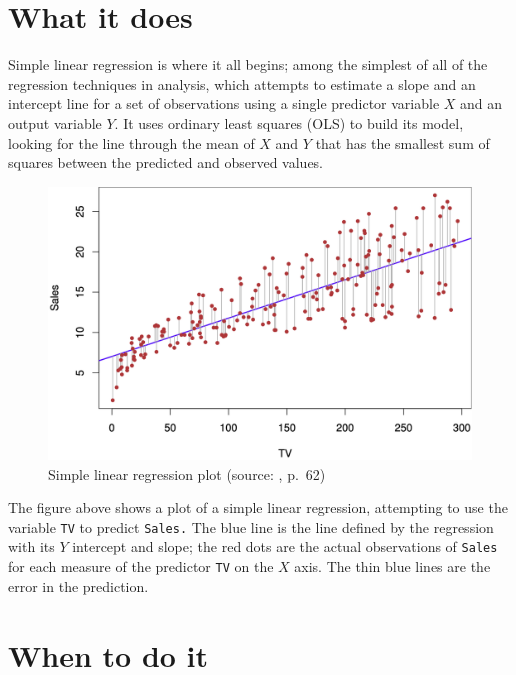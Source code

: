 \documentclass[
]{book}
\begin{document}
\hypertarget{what-it-does}{%
\section{What it does}\label{what-it-does}}

Simple linear regression is where it all begins; among the simplest of all of the regression techniques in analysis, which attempts to estimate a slope and an intercept line for a set of observations using a single predictor variable \(X\) and an output variable \(Y\). It uses ordinary least squares (OLS) to build its model, looking for the line through the mean of \(X\) and \(Y\) that has the smallest sum of squares between the predicted and observed values.



\begin{figure}
\centering
\includegraphics{images/3_1.png}
\caption{\label{fig:img-slr1}Simple linear regression plot (source: \citet{ISLR}, p.~62)}
\end{figure}

The figure above shows a plot of a simple linear regression, attempting to use the variable \texttt{TV} to predict \texttt{Sales.} The blue line is the line defined by the regression with its \(Y\) intercept and slope; the red dots are the actual observations of \texttt{Sales} for each measure of the predictor \texttt{TV} on the \(X\) axis. The thin blue lines are the error in the prediction.

\hypertarget{when-to-do-it}{%
\section{When to do it}\label{when-to-do-it}}
\end{document}
